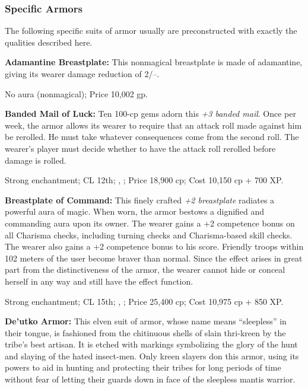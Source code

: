 
\subsubsection{Specific Armors}
The following specific suits of armor usually are preconstructed with exactly the qualities described here.

\textbf{Adamantine Breastplate:} This nonmagical breastplate is made of adamantine, giving its wearer damage reduction of 2/--.

No aura (nonmagical); Price 10,002 gp.

\textbf{Banded Mail of Luck:} Ten 100-cp gems adorn this \emph{+3 banded mail}. Once per week, the armor allows its wearer to require that an attack roll made against him be rerolled. He must take whatever consequences come from the second roll. The wearer's player must decide whether to have the attack roll rerolled before damage is rolled.

Strong enchantment; CL 12th; , ; Price 18,900 cp; Cost 10,150 cp + 700 XP.

\textbf{Breastplate of Command:} This finely crafted \emph{+2 breastplate} radiates a powerful aura of magic. When worn, the armor bestows a dignified and commanding aura upon its owner. The wearer gains a +2 competence bonus on all Charisma checks, including turning checks and Charisma-based skill checks. The wearer also gains a +2 competence bonus to his  score. Friendly troops within 102 meters of the user become braver than normal. Since the effect arises in great part from the distinctiveness of the armor, the wearer cannot hide or conceal herself in any way and still have the effect function.

Strong enchantment; CL 15th; , ; Price 25,400 cp; Cost 10,975 cp + 850 XP.

\textbf{De'utko Armor:} This elven suit of armor, whose name means ``sleepless'' in their tongue, is fashioned from the chitinuous shells of slain thri-kreen by the tribe's best artisan. It is etched with markings symbolizing the glory of the hunt and slaying of the hated insect-men. Only kreen slayers don this armor, using its powers to aid in hunting and protecting their tribes for long periods of time without fear of letting their guards down in face of the sleepless mantis warrior.

